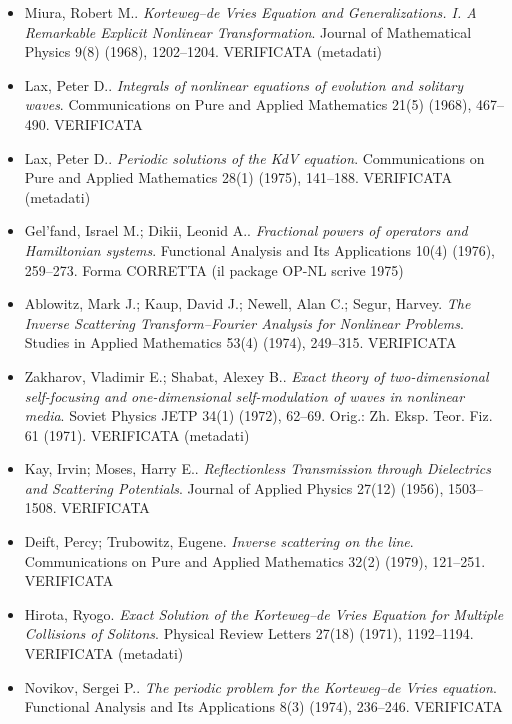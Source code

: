 \documentclass[11pt]{article}
\theoremstyle{plain}
\theoremstyle{definition}
\theoremstyle{remark}
\begin{document}
\begin{itemize}[itemsep=2pt,leftmargin=1.2em,font=\small]
\item Miura, Robert M.. \emph{{K}orteweg--de {V}ries Equation and Generalizations. {I}. {A} Remarkable Explicit Nonlinear Transformation}. Journal of Mathematical Physics 9(8) (1968), 1202--1204. \textsf{\footnotesize VERIFICATA (metadati)}
\item Lax, Peter D.. \emph{Integrals of nonlinear equations of evolution and solitary waves}. Communications on Pure and Applied Mathematics 21(5) (1968), 467--490. \textsf{\footnotesize VERIFICATA}
\item Lax, Peter D.. \emph{Periodic solutions of the {KdV} equation}. Communications on Pure and Applied Mathematics 28(1) (1975), 141--188. \textsf{\footnotesize VERIFICATA (metadati)}
\item Gel'fand, Israel M.; Dikii, Leonid A.. \emph{Fractional powers of operators and {H}amiltonian systems}. Functional Analysis and Its Applications 10(4) (1976), 259--273. \textsf{\footnotesize Forma CORRETTA (il package OP-NL scrive 1975)}
\item Ablowitz, Mark J.; Kaup, David J.; Newell, Alan C.; Segur, Harvey. \emph{The Inverse Scattering Transform--{F}ourier Analysis for Nonlinear Problems}. Studies in Applied Mathematics 53(4) (1974), 249--315. \textsf{\footnotesize VERIFICATA}
\item Zakharov, Vladimir E.; Shabat, Alexey B.. \emph{Exact theory of two-dimensional self-focusing and one-dimensional self-modulation of waves in nonlinear media}. Soviet Physics JETP 34(1) (1972), 62--69. \textsf{\footnotesize Orig.: Zh. Eksp. Teor. Fiz. 61 (1971). VERIFICATA (metadati)}
\item Kay, Irvin; Moses, Harry E.. \emph{Reflectionless Transmission through Dielectrics and Scattering Potentials}. Journal of Applied Physics 27(12) (1956), 1503--1508. \textsf{\footnotesize VERIFICATA}
\item Deift, Percy; Trubowitz, Eugene. \emph{Inverse scattering on the line}. Communications on Pure and Applied Mathematics 32(2) (1979), 121--251. \textsf{\footnotesize VERIFICATA}
\item Hirota, Ryogo. \emph{Exact Solution of the {K}orteweg--de {V}ries Equation for Multiple Collisions of Solitons}. Physical Review Letters 27(18) (1971), 1192--1194. \textsf{\footnotesize VERIFICATA (metadati)}
\item Novikov, Sergei P.. \emph{The periodic problem for the {K}orteweg--de {V}ries equation}. Functional Analysis and Its Applications 8(3) (1974), 236--246. \textsf{\footnotesize VERIFICATA}

\end{itemize}
\end{document}

